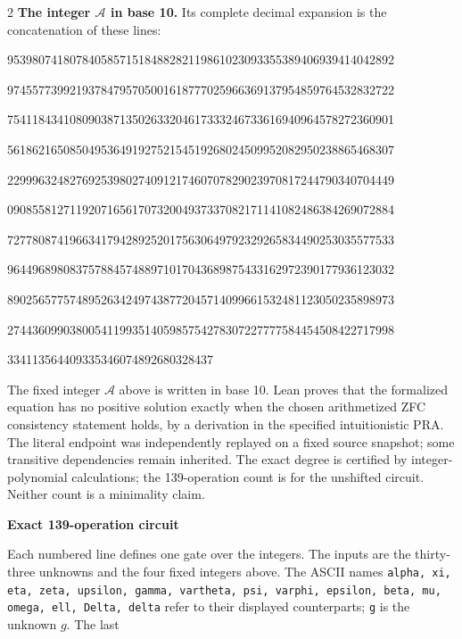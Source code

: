 \documentclass[10pt]{article}
\begin{document}
\begin{multicols}{2}
\textbf{The integer $\mathcal A$ in base 10.}
Its complete decimal expansion is the concatenation of these lines:\par
\begingroup\fontsize{7.7}{8.2}\selectfont{}\par
95398074180784058571518488282119861023093355389406939414042892\par
97455773992193784795705001618777025966369137954859764532832722\par
75411843410809038713502633204617333246733616940964578272360901\par
56186216508504953649192752154519268024509952082950238865468307\par
22999632482769253980274091217460707829023970817244790340704449\par
09085581271192071656170732004937337082171141082486384269072884\par
72778087419663417942892520175630649792329265834490253035577533\par
96449689808375788457488971017043689875433162972390177936123032\par
89025657757489526342497438772045714099661532481123050235898973\par
27443609903800541199351405985754278307227777584454508422717998\par
334113564409335346074892680328437\par
\endgroup
\normalfont\fontsize{7.7}{8.2}\selectfont
The fixed integer $\mathcal A$ above is written in base 10. Lean proves that the formalized equation has no positive solution exactly
when the chosen arithmetized ZFC consistency statement holds, by a derivation
in the specified intuitionistic PRA. The literal endpoint was independently
replayed on a fixed source snapshot; some transitive dependencies remain
inherited. The exact degree is certified by integer-polynomial calculations;
the 139-operation count is for the unshifted circuit. Neither count is a
minimality claim.
\end{multicols}
\clearpage
\begin{center}{\large\bfseries Exact 139-operation circuit}\end{center}
Each numbered line defines one gate over the integers. The inputs are the
thirty-three unknowns and the four fixed integers above. The ASCII names
\texttt{alpha, xi, eta, zeta, upsilon, gamma, vartheta, psi, varphi, epsilon, beta, mu, omega, ell, Delta, delta}
refer to their displayed counterparts; \texttt{g} is the unknown $g$. The last
\end{document}
